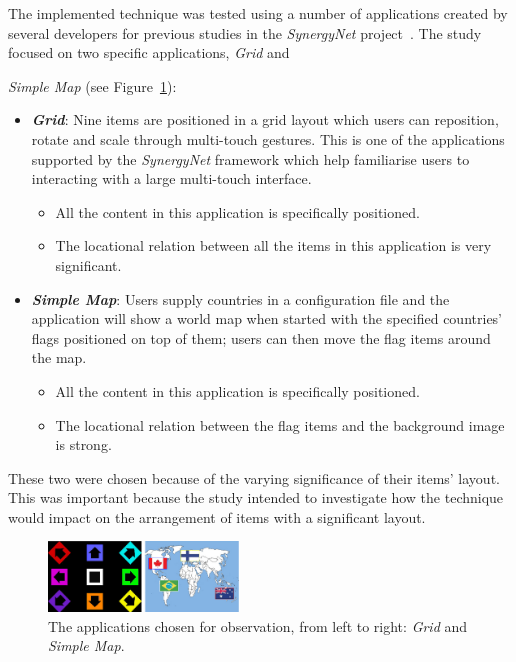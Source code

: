 \documentclass[twocolumn,compsoc]{cvm}
\begin{document}
The implemented technique was tested using a number of applications created by several developers for previous studies in the {\emph{SynergyNet}} project~\cite{higgins2011}.
The study focused on two specific applications, {\emph{Grid}} and {\emph{Simple Map} (see Figure~\ref{fig:apps}):\\

\begin{itemize}
  \item {\emph{\textbf{Grid}}}: 
  Nine items are positioned in a grid layout which users can reposition, rotate and scale through multi-touch gestures.
  This is one of the applications supported by the {\emph{SynergyNet}} framework which help familiarise users to interacting with a large multi-touch interface. 
    \begin{itemize}
    \item  All the content in this application is specifically positioned.
    \item The locational relation between all the items in this application is very significant.
  \end{itemize}
    \item {\emph{\textbf{Simple Map}}}: 
  Users supply countries in a configuration file and the application will show a world map when started with the specified countries' flags positioned on top of them; users can then move the flag items around the map.
    \begin{itemize}
    \item  All the content in this application is specifically positioned.
    \item The locational relation between the flag items and the background image is strong.
  \end{itemize}
\end{itemize}

These two were chosen because of the varying significance of their items' layout.
This was important because the study intended to investigate how the technique would impact on the arrangement of items with a significant layout.

\begin{figure}[h!] 
 \centering
  \includegraphics[width=0.45\textwidth]{figures/Applications.jpeg}
  \caption{The applications chosen for observation, from left to right:  {\emph{Grid}} and {\emph{Simple Map}}.}
  \label{fig:apps}
\end{figure}


}
\end{document}
